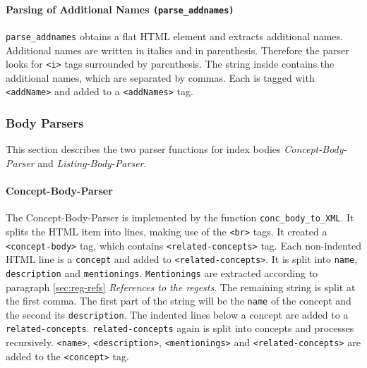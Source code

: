 \paragraph{Parsing of Additional Names \texttt{(parse\_addnames)}}
\label{sec:addNames}
\texttt{parse\_addnames} obtains a flat HTML element and extracts additional names. Additional names are written in italics and in parenthesis. Therefore the parser looks for \texttt{<i>} tags surrounded by parenthesis. The string inside contains the additional names, which are separated by commas. Each is tagged with \texttt{<addName>} and added to a \texttt{<addNames>} tag.


\subsubsection{Body Parsers}
This section describes the two parser functions for index bodies \textit{Concept-Body-Parser} and \textit{Listing-Body-Parser}.

\paragraph{Concept-Body-Parser}
\label{sec:conc-body-parser}
The Concept-Body-Parser is implemented by the function \texttt{conc\_body\_to\_XML}. It splits the HTML item into lines, making use of the \texttt{<br>} tags. It created a \texttt{<concept-body>} tag, which contains \texttt{<related-concepts>} tag. Each non-indented HTML line is a \texttt{concept} and added to \texttt{<related-concepts>}. It is split into \texttt{name}, \texttt{description} and \texttt{mentionings}. \texttt{Mentionings} are extracted according to paragraph \ref{sec:reg-refs} \textit{References to the regests}. The remaining string is split at the first comma. The first part of the string will be the \texttt{name} of the concept and the second its \texttt{description}. The indented lines below a concept are added to a \texttt{related-concepts}. \texttt{related-concepts} again is split into concepts and processes recursively. \texttt{<name>}, \texttt{<description>}, \texttt{<mentionings>} and \texttt{<related-concepts>} are added to the \texttt{<concept>} tag.


